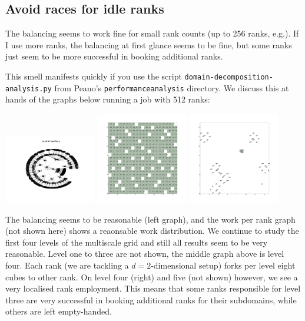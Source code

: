 {\subsection{Avoid races for idle ranks}

\begin{smell}
  The balancing seems to work fine for small rank counts (up to 256 ranks,
  e.g.). If I use more ranks, the balancing at first glance seems to be fine,
  but some ranks just seem to be more successful in booking additional ranks.
\end{smell}

\noindent
This smell manifests quickly if you use the script
\texttt{domain-decomposition-analysis.py} from Peano's
\texttt{performanceanalysis} directory. 
We discuss this at hands of the graphs below running a job with 512 ranks: 

\begin{center}
  \includegraphics[width=0.3\textwidth]{62_quick-tuning/rank-races.pdf}
  \includegraphics[width=0.3\textwidth]{62_quick-tuning/rank-races-level4.pdf}
  \includegraphics[width=0.3\textwidth]{62_quick-tuning/rank-races-level5.pdf}
\end{center}

\noindent
The balancing seems to be reasonable (left graph), and the work per rank
graph (not shown here) shows a reaonsable work distribution.
We continue to study the first four levels of the multiscale grid 
and still all results seem to be very reasonable. 
Level one to three are not shown, the middle graph above is level four.
Each rank (we are tackling a $d=2$-dimensional setup) forks per level eight
cubes to other rank.
On level four (right) and five (not shown) however, we see a very localised rank
employment.
This means that some ranks responsible for level three are very successful in
booking additional ranks for their subdomains, while others are left
empty-handed.

}
